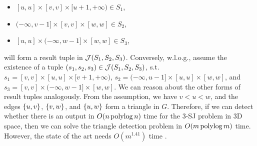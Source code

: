 \begin{itemize}
    \item $[u,u]\times [v,v]\times[u+1, +\infty)\in S_1$,
    \item $(-\infty,v-1]\times[v,v]\times [w,w] \in S_2$,
    \item $[u,u]\times(-\infty, w-1]\times [w,w] \in S_3$,
\end{itemize}
will form a result tuple in $\mathcal{J}(S_1,S_2,S_3)$. Conversely, w.l.o.g., assume the existence of a tuple $(s_1,s_2,s_3)\in \mathcal{J}(S_1,S_2,S_3)$, s.t. $s_1 = [v,v]\times [u,u]\times[v+1, +\infty)$, $s_2 = (-\infty,u-1]\times[u,u]\times [w,w]$, and $s_3 = [v,v]\times(-\infty, w-1]\times [w,w]$. We can reason about the other forms of result tuples analogously. From the assumption, we have $v< u< w$, and the edges $\{u,v\}$, $\{v,w\}$, and $\{u,w\}$ form a triangle in $G$. Therefore, if we can detect whether there is an output in $O(n\operatorname*{polylog} n)$ time for the 3-SJ problem in 3D space, then we can solve the triangle detection problem 
in $O(m \operatorname*{polylog} m)$ time. However, the state of the art needs $O(m^{1.41})$ time \cite{ayz97}.